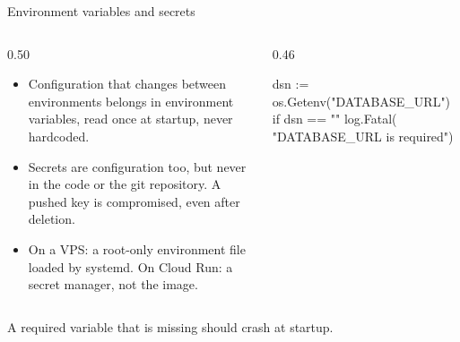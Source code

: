 \documentclass[10pt,aspectratio=169,t]{beamer}
\begin{document}
\begin{frame}[fragile,eyebrow=Deploying]{Environment variables and secrets}
  \begin{columns}[T]
    \begin{column}{0.50\textwidth}
      \begin{itemize}
        \item Configuration that changes between environments belongs in environment variables, read once at startup, never hardcoded.
        \item Secrets are configuration too, but never in the code or the git repository. A pushed key is compromised, even after deletion.
        \item On a VPS: a root-only environment file loaded by systemd. On Cloud Run: a secret manager, not the image.
      \end{itemize}
    \end{column}
    \begin{column}{0.46\textwidth}
\begin{golang}
dsn := os.Getenv("DATABASE_URL")
if dsn == "" {
    log.Fatal(
        "DATABASE_URL is required")
}
\end{golang}
    \end{column}
  \end{columns}
  \begin{takeaway}{A required variable that is missing should crash at startup.}
  \end{takeaway}
\end{frame}
\end{document}
